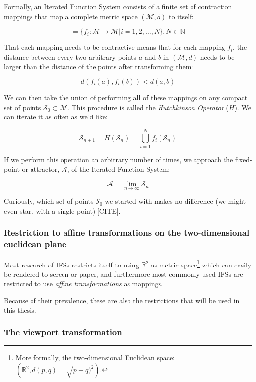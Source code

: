 \documentclass[11pt]{article}
\begin{document}
Formally, an Iterated Function System consists of a finite set of contraction mappings that map a complete metric space \((\mathcal{M}, d)\) to itself:

$$ = \{ f_i : \mathcal{M} \rightarrow \mathcal{M} | i = 1, 2, \ldots, N \}, N \in \mathbb{N}$$

That each mapping needs to be contractive means that for each mapping \(f_i\), the distance between every two arbitrary points \(a\) and \(b\) in \((\mathcal{M}, d)\) needs to be larger than the distance of the points after transforming them:

$$d(f_i(a), f_i(b)) < d(a, b)$$

We can then take the union of performing all of these mappings on any compact set of points \(\mathcal{S}_0 \subset \mathcal{M}\). This procedure is called the \emph{Hutchkinson Operator} (\(H\)). 
We can iterate it as often as we'd like:

$$ \mathcal{S}_{n + 1} = H(\mathcal{S}_n) = \bigcup_{i=1}^{N} f_i(\mathcal{S}_n) $$

If we perform this operation an arbitrary number of times, we approach the fixed-point or attractor, \(\mathcal{A}\), of the Iterated Function System:

$$\mathcal{A} = \lim_{n \rightarrow \infty} \mathcal{S}_n$$

Curiously, which set of points \(\mathcal{S}_0\) we started with makes no difference (we might even start with a single point) [CITE].

\subsubsection{Restriction to affine transformations on the two-dimensional euclidean plane}
\label{sec:org3bb0e71}

Most research of IFSs restricts itself to using \(\mathbb{R}^2\) as metric space\footnote{More formally, the two-dimensional Euclidean space: \(\left(\mathbb{R}^2, d(p, q) = \sqrt{p - q)^2}\right)\).} which can easily be rendered to screen or paper,
and furthermore most commonly-used IFSs are restricted to use \emph{affine transformations} as mappings.

Because of their prevalence, these are also the restrictions that will be used in this thesis.

\subsubsection{The viewport transformation}
\label{sec:orga7d85b7}
\label{subsection:viewport_transformation}
\end{document}
